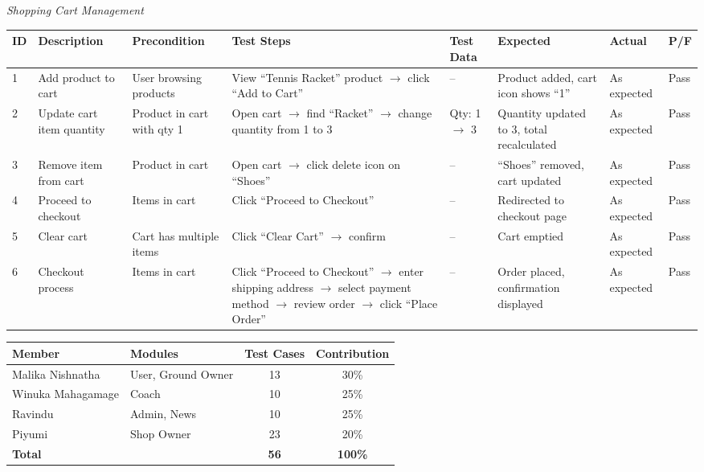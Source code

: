 \documentclass[12pt,a4paper]{report}
\begin{document}
\textit{Shopping Cart Management}

\begin{center}
\footnotesize
\begin{longtable}{p{0.4cm} p{2.2cm} p{1.8cm} p{3.2cm} p{2.2cm} p{2.2cm} p{1.4cm} p{0.8cm}}
\toprule
\textbf{ID} & \textbf{Description} & \textbf{Precondition} & \textbf{Test Steps} & \textbf{Test Data} & \textbf{Expected} & \textbf{Actual} & \textbf{P/F}\\
\midrule
\endhead
1 & Add product to cart & User browsing products & View ``Tennis Racket'' product $\to$ click ``Add to Cart'' & -- & Product added, cart icon shows ``1'' & As expected & Pass\\[4pt]
2 & Update cart item quantity & Product in cart with qty 1 & Open cart $\to$ find ``Racket'' $\to$ change quantity from 1 to 3 & Qty: 1 $\to$ 3 & Quantity updated to 3, total recalculated & As expected & Pass\\[4pt]
3 & Remove item from cart & Product in cart & Open cart $\to$ click delete icon on ``Shoes'' & -- & ``Shoes'' removed, cart updated & As expected & Pass\\[4pt]
4 & Proceed to checkout & Items in cart & Click ``Proceed to Checkout'' & -- & Redirected to checkout page & As expected & Pass\\[4pt]
5 & Clear cart & Cart has multiple items & Click ``Clear Cart'' $\to$ confirm & -- & Cart emptied & As expected & Pass\\[4pt]
6 & Checkout process & Items in cart & Click ``Proceed to Checkout'' $\to$ enter shipping address $\to$ select payment method $\to$ review order $\to$ click ``Place Order'' & -- & Order placed, confirmation displayed & As expected & Pass\\
\bottomrule
\end{longtable}
\end{center}

\bigskip
\begin{center}
\begin{tabular}{llcc}
\toprule
\textbf{Member} & \textbf{Modules} & \textbf{Test Cases} & \textbf{Contribution}\\
\midrule
Malika Nishnatha  & User, Ground Owner  & 13 & 30\%\\
Winuka Mahagamage & Coach               & 10 & 25\%\\
Ravindu           & Admin, News         & 10 & 25\%\\
Piyumi            & Shop Owner          & 23 & 20\%\\
\midrule
\textbf{Total}    &                     & \textbf{56} & \textbf{100\%}\\
\bottomrule
\end{tabular}
\end{center}
\end{document}
